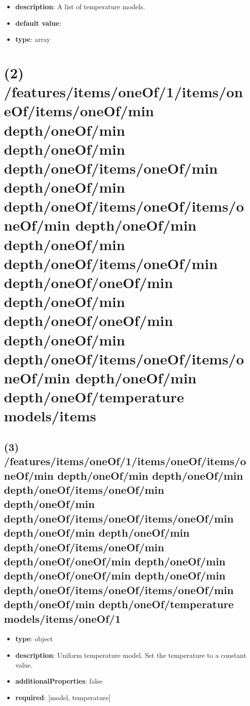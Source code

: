 \begin{itemize}[leftmargin=1em]\item {\bf description}: A list of temperature models.
\item {\bf default value}: 
\item {\bf type}: array
\end{itemize}\section{(2) /features/items/oneOf/1/items/oneOf/items/oneOf/min depth/oneOf/min depth/oneOf/min depth/oneOf/items/oneOf/min depth/oneOf/min depth/oneOf/items/oneOf/items/oneOf/min depth/oneOf/min depth/oneOf/min depth/oneOf/items/oneOf/min depth/oneOf/oneOf/min depth/oneOf/min depth/oneOf/oneOf/min depth/oneOf/min depth/oneOf/items/oneOf/items/oneOf/min depth/oneOf/min depth/oneOf/temperature models/items}

\subsection{(3) /features/items/oneOf/1/items/oneOf/items/oneOf/min depth/oneOf/min depth/oneOf/min depth/oneOf/items/oneOf/min depth/oneOf/min depth/oneOf/items/oneOf/items/oneOf/min depth/oneOf/min depth/oneOf/min depth/oneOf/items/oneOf/min depth/oneOf/oneOf/min depth/oneOf/min depth/oneOf/oneOf/min depth/oneOf/min depth/oneOf/items/oneOf/items/oneOf/min depth/oneOf/min depth/oneOf/temperature models/items/oneOf/1}
\begin{itemize}[leftmargin=3em]\item {\bf type}: object
\item {\bf description}: Uniform temperature model. Set the temperature to a constant value.
\item {\bf additionalProperties}: false
\item {\bf required}: [model, temperature]\end{itemize}
